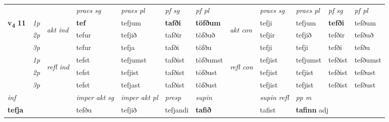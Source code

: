 \begin{longtable}[l]{X>{\footnotesize\itshape}llXXXXlXXXX}
 & &   & \textit{praes sg}  & \textit{praes pl}    & \textit{ pf sg} & \textit{pf pl} & & \textit{praes sg}  & \textit{praes pl}    & \textit{pf sg} & \textit{pf pl }  \\ \cmidrule{4-7} \cmidrule{9-12}
 \multirow{2}{*}{{{\textbf{v{\textsubscript{4}}} \Large{\textbf{11}}}}}  & 1p & \multirow{3}{*}{\begin{turn}{90}\textit{akt ind}\end{turn}} & \textbf{tef} & tefjum & \textbf{tafði} & \textbf{töfðum} & \multirow{3}{*}{\begin{turn}{90}\textit{akt con}\end{turn}} &tefji & tefjum & \textbf{tefði} & tefðum\\*
 & 2p &  &  tefur  & tefjið & tafðir & töfðuð & & tefjir & tefjið & tefðir & tefðuð \\*
 & 3p &  & tefur & tefja & tafði & töfðu & & tefji & tefji& tefði & tefðu \\*
\cmidrule{4-7} \cmidrule{9-12}
 & 1p & \multirow{3}{*}{\begin{turn}{90}\textit{refl ind}\end{turn}}  & tefst & tefjumst & tafðist & töfðumst & \multirow{3}{*}{\begin{turn}{90}\textit{refl con}\end{turn}}  &tefjist & tefjumst & tefðist & tefðumst \\*
 & 2p &  & tefst & tefjist & tafðist & töfðust & &tefjist & tefjist & tefðist & tefðust \\*
 & 3p  & & tefst & tefjast & tafðist & töfðust & & tefjist & tefjist& tefðist & tefðust \\*
\cmidrule{4-7} \cmidrule{9-12}

   {\textit{inf}} & &  & \textit{imper akt sg} & \textit{imper akt pl}   & \textit{presp} & \textit{supin} && \textit{supin refl} & \textit{pp m} \\*
  {\textbf{tefja}} & && tefðu  & tefjið   & tefjandi &  \textbf{tafið} && tafist & \multicolumn{2}{l}{\textbf{tafinn} adj\textbf{\textsubscript{}}} \\*


\end{longtable}
